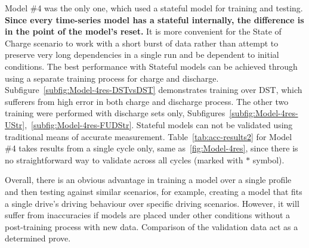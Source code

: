 %
Model \#4 was the only one, which used a stateful model for training and testing.
\textbf{Since every time-series model has a stateful internally, the difference is in the point of the model's reset.}
It is more convenient for the State of Charge scenario to work with a short burst of data rather than attempt to preserve very long dependencies in a single run and be dependent to initial conditions.
%
%
The best performance with Stateful models can be achieved through using a separate training process for charge and discharge. 
\mbox{Subfigure~\ref{subfig:Model-4res-DSTvsDST}} demonstrates training over DST, which sufferers from high error in both charge and discharge process.
The other two training were performed with discharge sets only, \mbox{Subfigures~\ref{subfig:Model-4res-UStr}, \ref{subfig:Model-4res-FUDStr}}.
Stateful models can not be validated using traditional means of accurate measurement.
\mbox{Table~\ref{tab:acc-results2}} for Model \#4 takes results from a single cycle only, same as~\ref{fig:Model-4res}, since there is no straightforward way to validate across all cycles (marked with $*$ symbol).

%
%
%
%
%
%
%
%
%
%
%
%
% 
%
%
Overall, there is an obvious advantage in training a model over a single profile and then testing against similar scenarios, for example, creating a model that fits a single drive's driving behaviour over specific driving scenarios.
However, it will suffer from inaccuracies if models are placed under other conditions without a post-training process with new data.
Comparison of the validation data act as a determined prove.
